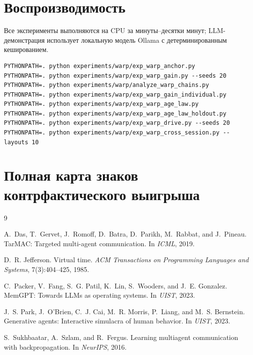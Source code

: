 \documentclass{article}
\begin{document}
\section{Воспроизводимость}
\label{app:repro}
Все эксперименты выполняются на CPU за минуты--десятки минут;
LLM-демонстрация использует локальную модель Ollama с
детерминированным кешированием.
\begin{verbatim}
PYTHONPATH=. python experiments/warp/exp_warp_anchor.py
PYTHONPATH=. python experiments/warp/exp_warp_gain.py --seeds 20
PYTHONPATH=. python experiments/warp/analyze_warp_chains.py
PYTHONPATH=. python experiments/warp/exp_warp_gain_individual.py
PYTHONPATH=. python experiments/warp/exp_warp_age_law.py
PYTHONPATH=. python experiments/warp/exp_warp_age_law_holdout.py
PYTHONPATH=. python experiments/warp/exp_warp_drive.py --seeds 20
PYTHONPATH=. python experiments/warp/exp_warp_cross_session.py --layouts 10
\end{verbatim}

\section{Полная карта знаков контрфактического выигрыша}
\label{app:signmap}

\begin{thebibliography}{9}

A.~Das, T.~Gervet, J.~Romoff, D.~Batra, D.~Parikh, M.~Rabbat, and
J.~Pineau.
\newblock TarMAC: Targeted multi-agent communication.
\newblock In \emph{ICML}, 2019.

D.~R. Jefferson.
\newblock Virtual time.
\newblock \emph{ACM Transactions on Programming Languages and Systems},
7(3):404--425, 1985.

C.~Packer, V.~Fang, S.~G. Patil, K.~Lin, S.~Wooders, and J.~E.
Gonzalez.
\newblock MemGPT: Towards LLMs as operating systems.
\newblock In \emph{UIST}, 2023.

J.~S. Park, J.~O'Brien, C.~J. Cai, M.~R. Morris, P.~Liang, and M.~S.
Bernstein.
\newblock Generative agents: Interactive simulacra of human behavior.
\newblock In \emph{UIST}, 2023.

S.~Sukhbaatar, A.~Szlam, and R.~Fergus.
\newblock Learning multiagent communication with backpropagation.
\newblock In \emph{NeurIPS}, 2016.

\end{thebibliography}
\end{document}
